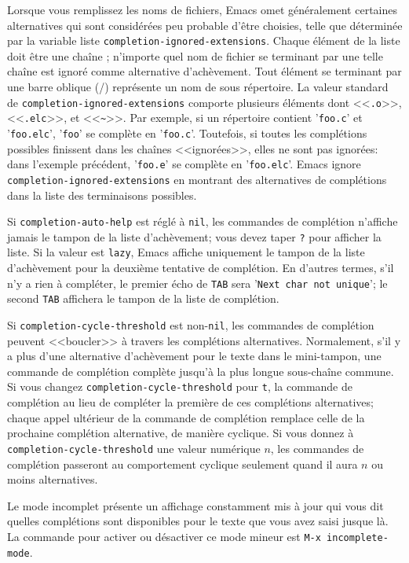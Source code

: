 Lorsque vous remplissez les noms de fichiers, Emacs omet généralement
certaines alternatives qui sont considérées peu probable d'être
choisies, telle que déterminée par la variable liste
\texttt{completion-ignored-extensions}. Chaque élément de la liste
doit être une chaîne ; n'importe quel nom de fichier se terminant par
une telle chaîne est ignoré comme alternative d'achèvement. Tout
élément se terminant par une barre oblique (\slash ) représente un nom
de sous répertoire. La valeur standard de
\texttt{completion-ignored-extensions} comporte plusieurs éléments
dont <<\texttt{.o}>>, <<\texttt{.elc}>>, et
<<\texttt{\textasciitilde}>>. Par exemple, si un répertoire contient
'\texttt{foo.c}' et '\texttt{foo.elc}', '\texttt{foo}' se complète en
'\texttt{foo.c}'. Toutefois, si toutes les complétions possibles
finissent dans les chaînes <<ignorées>>, elles ne sont pas ignorées:
dans l'exemple précédent, '\texttt{foo.e}' se complète en
'\texttt{foo.elc}'. Emacs ignore
\texttt{completion-ignored-extensions} en montrant des alternatives de
complétions dans la liste des terminaisons possibles.

Si \texttt{completion-auto-help} est réglé à \texttt{nil}, les
commandes de complétion n'affiche jamais le tampon de la liste
d'achèvement; vous devez taper \texttt{?} pour afficher la liste. Si
la valeur est \texttt{lazy}, Emacs affiche uniquement le tampon de la
liste d'achèvement pour la deuxième tentative de complétion. En
d'autres termes, s'il n'y a rien à compléter, le premier écho de
\texttt{TAB} sera '\texttt{Next char not unique}'; le second
\texttt{TAB} affichera le tampon de la liste de complétion.

Si \texttt{completion-cycle-threshold} est non-\texttt{nil}, les
commandes de complétion peuvent <<boucler>> à travers les complétions
alternatives. Normalement, s'il y a plus d'une alternative
d'achèvement pour le texte dans le mini-tampon, une commande de
complétion complète jusqu'à la plus longue sous-chaîne commune. Si
vous changez \texttt{completion-cycle-threshold} pour \texttt{t}, la
commande de complétion au lieu de compléter la première de ces
complétions alternatives; chaque appel ultérieur de la commande
de complétion remplace celle de la prochaine complétion alternative,
de manière cyclique. Si vous donnez
 à \texttt{completion-cycle-threshold} une valeur numérique $n$, les
 commandes de complétion passeront au comportement cyclique seulement
 quand il aura $n$ ou moins alternatives. 

Le mode incomplet présente un affichage constamment mis à jour qui
vous dit quelles complétions sont disponibles pour le texte que vous
avez saisi jusque là. La commande pour activer ou désactiver ce mode
mineur est \texttt{M-x incomplete-mode}.

